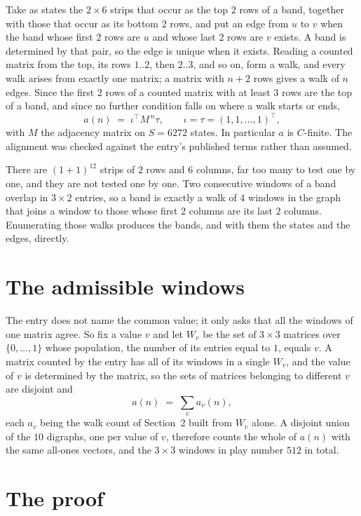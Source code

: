 \documentclass[11pt,a4paper]{article}
\theoremstyle{plain}
\theoremstyle{definition}
\begin{document}
Take as states the $2\times6$ strips that occur as the top $2$ rows of a band,
together with those that occur as its bottom $2$ rows, and put an edge from $u$ to $v$
when the band whose first $2$ rows are $u$ and whose last $2$ rows are $v$ exists.
A band is determined by that pair, so the edge is unique when it exists. Reading a counted
matrix from the top, its rows $1..2$, then $2..3$, and so on, form a walk, and every
walk arises from exactly one matrix; a matrix with $n+2$ rows gives a walk of $n$ edges.
Since the first $2$ rows of a counted matrix with at least $3$ rows are the top of a
band, and since no further condition falls on where a walk starts or ends,
\[
a(n)\;=\;\iota^{\!\top}M^{\,n}\tau ,\qquad \iota=\tau=(1,1,\dots,1)^{\!\top},
\]
with $M$ the adjacency matrix on $S=6272$ states. In particular $a$ is $C$-finite. The
alignment was checked against the entry's published terms rather than assumed.

There are $(1 + 1)^{12}$ strips of $2$ rows and $6$ columns, far too
many to test one by one, and they are not tested one by one. Two consecutive windows of a band
overlap in $3\times2$ entries, so a band is exactly a walk of $4$ windows in
the graph that joins a window to those whose first $2$ columns are its last $2$
columns. Enumerating those walks produces the bands, and with them the states and the edges,
directly.

\section{The admissible windows}

The entry does not name the common value; it only asks that all the windows of one matrix agree.
So fix a value $v$ and let $W_v$ be the set of $3\times3$ matrices over
$\{0,\dots,1\}$ whose population, the number of its entries equal to $1$, equals $v$. A matrix counted by the entry has all of
its windows in a single $W_v$, and the value of $v$ is determined by the matrix, so the sets of
matrices belonging to different $v$ are disjoint and
\[
a(n)\;=\;\sum_v a_v(n),
\]
each $a_v$ being the walk count of Section~2 built from $W_v$ alone. A disjoint union of the
$10$ digraphs, one per value of $v$, therefore counts the whole of $a(n)$ with the same
all-ones vectors, and the $3\times3$ windows in play number $512$ in total.

\section{The proof}
\end{document}
